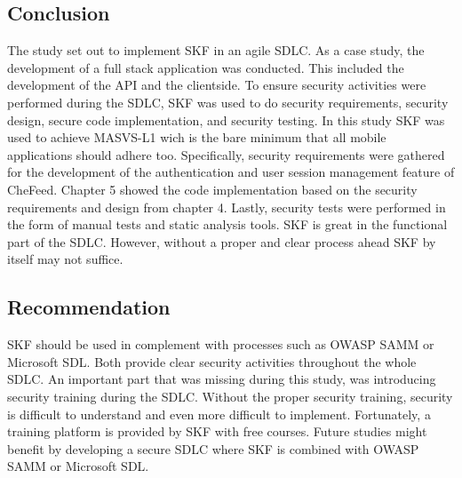 \subsection{Conclusion}
The study set out to implement SKF in an agile SDLC. As a case study, the development of a full stack application was conducted. This included the development of the API and the clientside. To ensure security activities were performed during the SDLC, SKF was used to do security requirements, security design, secure code implementation, and security testing. In this study SKF was used to achieve MASVS-L1 wich is the bare minimum that all mobile applications should adhere too. Specifically, security requirements were gathered for the development of the authentication and user session management feature of CheFeed. Chapter 5 showed the code implementation based on the security requirements and design from chapter 4. Lastly, security tests were performed in the form of manual tests and static analysis tools. SKF is great in the functional part of the SDLC. However, without a proper and clear process ahead SKF by itself may not suffice. 

\subsection{Recommendation}
SKF should be used in complement with processes such as OWASP SAMM or Microsoft SDL. Both provide clear security activities throughout the whole SDLC. An important part that was missing during this study, was introducing security training during the SDLC. Without the proper security training, security is difficult to understand and even more difficult to implement. Fortunately, a training platform is provided by SKF with free courses. Future studies might benefit by developing a secure SDLC where SKF is combined with OWASP SAMM or Microsoft SDL.


